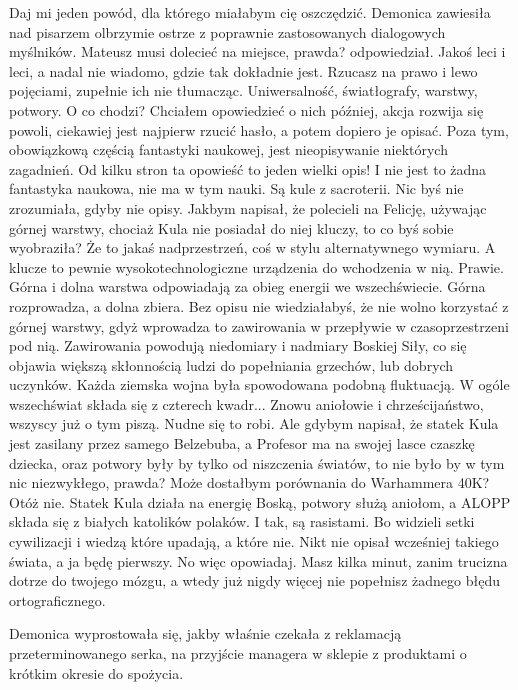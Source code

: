 \begin{dialogue}
\ds{} Daj mi jeden powód, dla którego miałabym cię oszczędzić. \dm{} Demonica zawiesiła nad pisarzem olbrzymie ostrze z poprawnie zastosowanych dialogowych myślników.
\ds{} Mateusz musi dolecieć na miejsce, prawda? \dm{} odpowiedział.
\ds{} Jakoś leci i leci, a nadal nie wiadomo, gdzie tak dokładnie jest. Rzucasz na prawo i lewo pojęciami, zupełnie ich nie tłumacząc.
Uniwersalność, światłografy, warstwy, potwory. O co chodzi?
\ds{} Chciałem opowiedzieć o nich później, akcja rozwija się powoli, ciekawiej jest najpierw rzucić hasło, a potem dopiero je opisać.
Poza tym, obowiązkową częścią fantastyki naukowej, jest nieopisywanie niektórych zagadnień.
\ds{} Od kilku stron ta opowieść to jeden wielki opis! I nie jest to żadna fantastyka naukowa, nie ma w tym nauki. Są kule z sacroterii.
\ds{} Nic byś nie zrozumiała, gdyby nie opisy. Jakbym napisał, że polecieli na Felicję, używając górnej warstwy, chociaż Kula nie posiadał do niej kluczy, to co byś sobie wyobraziła?
\ds{} Że to jakaś nadprzestrzeń, coś w stylu alternatywnego wymiaru. A klucze to pewnie wysokotechnologiczne urządzenia do wchodzenia w nią.
\ds{} Prawie. Górna i dolna warstwa odpowiadają za obieg energii we wszechświecie. Górna rozprowadza, a dolna zbiera.
Bez opisu nie wiedziałabyś, że nie wolno korzystać z górnej warstwy, gdyż wprowadza to zawirowania w przepływie w czasoprzestrzeni pod nią.
Zawirowania powodują niedomiary i nadmiary Boskiej Siły, co się objawia większą skłonnością ludzi do popełniania grzechów, lub dobrych uczynków.
Każda ziemska wojna była spowodowana podobną fluktuacją.
W ogóle wszechświat składa się z czterech kwadr...
\ds{} Znowu aniołowie i chrześcijaństwo, wszyscy już o tym piszą. Nudne się to robi.
\ds{} Ale gdybym napisał, że statek Kula jest zasilany przez samego Belzebuba, a Profesor ma na swojej lasce czaszkę dziecka, oraz potwory były by tylko od niszczenia światów, to nie było by w tym nic niezwykłego, prawda? Może dostałbym porównania do Warhammera 40K? Otóż nie. Statek Kula działa na energię Boską, potwory służą aniołom, a ALOPP składa się z białych katolików polaków. 
I tak, są rasistami. Bo widzieli setki cywilizacji i wiedzą które upadają, a które nie.
Nikt nie opisał wcześniej takiego świata, a ja będę pierwszy.
\ds{} No więc opowiadaj. Masz kilka minut, zanim trucizna dotrze do twojego mózgu, a wtedy już nigdy więcej nie popełnisz żadnego błędu ortograficznego.
\end{dialogue}
Demonica wyprostowała się, jakby właśnie czekała z reklamacją przeterminowanego serka, na przyjście managera w sklepie z produktami o krótkim okresie do spożycia.

